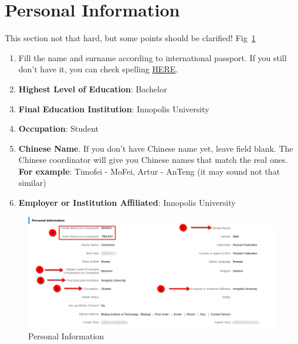 \section{Personal Information}\label{sec:ru_personal_info}

This section not that hard, but some points should be clarified!
Fig~\ref{fig:ru_pers_info}

\begin{enumerate}
    \item Fill the name and surname according to international passport.
        If you still don't have it, you can check spelling
        \href{https://www.gosuslugi.ru/help/faq/foreign_passport/100359}{HERE}.

    \item \textbf{Highest Level of Education}: Bachelor

    \item \textbf{Final Education Institution}: Innopolis University

    \item \textbf{Occupation}: Student

    \item \textbf{Chinese Name}.
        If you don't have Chinese name yet, leave field blank.
        The Chinese coordinator will give you Chinese names that match the real ones. \\
        \textbf{For example}: Timofei - MoFei, Artur - AnTeng (it may sound not that similar)

    \item \textbf{Employer or Institution Affiliated}: Innopolis University
\end{enumerate}


\begin{figure}[H]
    \centering
    \includegraphics[width=\textwidth]{russia/imgs/app_4_personal_info}
    \caption{\centering Personal Information}
    \label{fig:ru_pers_info}
\end{figure}









